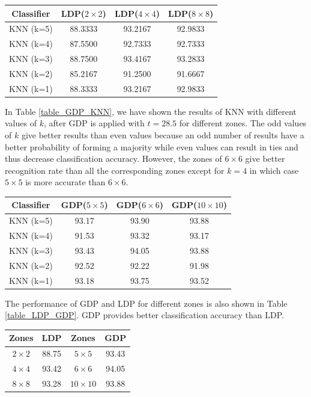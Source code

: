\documentclass[conference]{IEEEtran}
\begin{document}
\begin{center}
	\label{table_LDP_KNN}
	\begin{tabular}{cccc}
		\hline
		Classifier & LDP($2\times2$) & LDP($4\times4$) & LDP($8\times8$) \\
		\hline
		KNN (k=5) & 88.3333 & 93.2167 & 92.9833\\
		KNN (k=4) & 87.5500 & 92.7333 & 92.7333\\
		KNN (k=3) & 88.7500 & 93.4167 & 93.2833\\
		KNN (k=2) & 85.2167 & 91.2500 & 91.6667\\
		KNN (k=1) & 88.3333 & 93.2167 & 92.9833\\
		\hline
	\end{tabular}
\end{center}

In Table \ref{table_GDP_KNN}, we have shown the results of KNN with different values of $k$, after GDP is applied with $t = 28.5$ for different zones. The odd values of $k$ give better results than even values because an odd number of results have a better probability of forming a majority while even values can result in ties and thus decrease classification accuracy. However, the zones of $6\times6$ give better recognition rate than all the corresponding zones except for $k = 4$ in which case $5\times5$ is more accurate than $6\times6$.

\begin{center}
	\label{table_GDP_KNN}
	\begin{tabular}{cccc}
		\hline
		Classifier & GDP($5\times5$) & GDP($6\times6$) & GDP($10\times10$)\\
		\hline
		KNN (k=5) & 93.17 & 93.90 & 93.88\\
		KNN (k=4) & 91.53 & 93.32 & 93.17\\
		KNN (k=3) & 93.43 & 94.05 & 93.88\\
		KNN (k=2) & 92.52 & 92.22 & 91.98\\
		KNN (k=1) & 93.18 & 93.75 & 93.52\\
		\hline
	\end{tabular}
\end{center}

The performance of GDP and LDP for different zones is also shown in Table \ref{table_LDP_GDP}. GDP provides better classification accuracy than LDP.

\begin{center}
	\label{table_LDP_GDP}
	\begin{tabular}{cccc}
		\hline
		Zones & LDP & Zones & GDP \\
		\hline
		$2 \times 2$ & 88.75 & $5 \times 5$ & 93.43 \\
		$4 \times 4$ & 93.42 & $6 \times 6$ & 94.05 \\
		$8 \times 8$ & 93.28 & $10 \times 10$ & 93.88 \\
		\hline
	\end{tabular}
\end{center}
\end{document}
